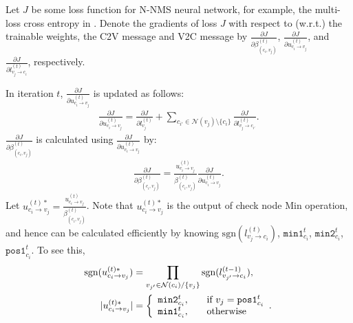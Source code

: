 \documentclass [PhD] {uclathes}
\begin{document}
Let $J$ be some loss function for N-NMS neural network, for example, the multi-loss cross entropy in \cite{Nachmani2016-bs}. Denote the gradients of loss $J$ with respect to (w.r.t.) the trainable weights, the C2V message and V2C message by $\frac{\partial J}{ \partial \beta^{(t)}_{(c_i,v_j)}}$, $\frac{\partial J}{\partial u^{(t)}_{c_i\rightarrow v_j}}$, and $\frac{\partial J}{\partial l^{(t)}_{v_j \rightarrow c_i}}$, respectively.

In iteration $t$, $\frac{\partial J}{\partial u^{(t)}_{c_i \rightarrow v_j}}$ is updated as follows:
\begin{align}
\label{equ: update-c}
    \frac{\partial J}{\partial u^{(t)}_{c_i \rightarrow v_j}} = \frac{\partial J}{\partial l^{(t)}_{v_j}}+ \sum_{c_{i'}\in \mathcal{N}(v_j)\setminus\{c_i\}}\frac{\partial J}{\partial l^{(t)}_{ v_j\rightarrow c_{i'} }}.
\end{align}
$\frac{\partial J}{\partial \beta^{(t)}_{(c_i,v_j)}}$ is calculated using $\frac{\partial J}{\partial u^{(t)}_{c_i \rightarrow v_j}}$ by:
\begin{align}\label{equ: gradient_beta}
    \frac{\partial J}{\partial \beta^{(t)}_{(c_i,v_j)}} = \frac{u^{(t)}_{c_i \rightarrow v_j}}{\beta^{(t)}_{(c_i, v_j)}} \frac{\partial J}{\partial u^{(t)}_{c_i\rightarrow v_j}}.
\end{align}
Let $u^{(t)*}_{c_i\rightarrow v_j}=\frac{u^{(t)}_{c_i \rightarrow v_j}}{\beta^{(t)}_{(c_i, v_j)}}$. Note that $u^{(t)*}_{c_i\rightarrow v_j}$ is the output of check node Min operation, and hence can be calculated efficiently  by knowing ${\mathrm{sgn}}(l^{(t)}_{v_j\rightarrow c_i})$, $\texttt{min1}^{t}_{c_i}$, $\texttt{min2}^{t}_{c_i}$, $\texttt{pos1}^{t}_{c_i}$. To see this,
\begingroup
\allowdisplaybreaks
\begin{align}
    \text{sgn}(u^{(t)*}_{c_i \rightarrow v_j}) &=   \prod_{v_{j'}\in \mathcal{N}(c_i)/\{v_j\}} \text{sgn}(l^{(t-1)}_{v_{j'}\rightarrow c_{i}}), \\
    |{u^{(t)*}_{c_i \rightarrow v_j}}| &= 
     \left\{ \begin{array}{l l}  \texttt{min2}^{t}_{c_i}, &  \quad  \text{if }v_j =  \texttt{pos1}^{t}_{c_i}   \\  \texttt{min1}^{t}_{c_i}, &  \quad \text{otherwise} \\ \end{array}. \right.
\end{align}
\endgroup
\end{document}
